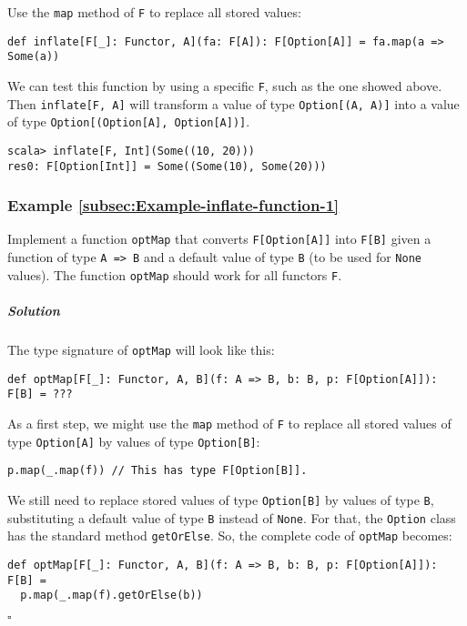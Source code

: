 Use the \lstinline!map! method of \lstinline!F! to replace all stored
values:
\begin{lstlisting}
def inflate[F[_]: Functor, A](fa: F[A]): F[Option[A]] = fa.map(a => Some(a))
\end{lstlisting}
We can test this function by using a specific \lstinline!F!, such
as the one showed above. Then \lstinline!inflate[F, A]! will transform
a value of type \lstinline!Option[(A, A)]! into a value of type \lstinline!Option[(Option[A], Option[A])]!.
\begin{lstlisting}
scala> inflate[F, Int](Some((10, 20)))
res0: F[Option[Int]] = Some((Some(10), Some(20)))
\end{lstlisting}


\subsubsection{Example \label{subsec:Example-inflate-function-1}\ref{subsec:Example-inflate-function-1}}

Implement a function \lstinline!optMap! that converts \lstinline!F[Option[A]]!
into \lstinline!F[B]! given a function of type \lstinline!A => B!
and a default value of type \lstinline!B! (to be used for \lstinline!None!
values). The function \lstinline!optMap! should work for all functors
\lstinline!F!.

\subparagraph{Solution}

The type signature of \lstinline!optMap! will look like this:
\begin{lstlisting}
def optMap[F[_]: Functor, A, B](f: A => B, b: B, p: F[Option[A]]): F[B] = ???
\end{lstlisting}

As a first step, we might use the \lstinline!map! method of \lstinline!F!
to replace all stored values of type \lstinline!Option[A]! by values
of type \lstinline!Option[B]!:
\begin{lstlisting}
p.map(_.map(f)) // This has type F[Option[B]].
\end{lstlisting}
We still need to replace stored values of type \lstinline!Option[B]!
by values of type \lstinline!B!, substituting a default value of
type \lstinline!B! instead of \lstinline!None!. For that, the \lstinline!Option!
class has the standard method \lstinline!getOrElse!. So, the complete
code of \lstinline!optMap! becomes:
\begin{lstlisting}
def optMap[F[_]: Functor, A, B](f: A => B, b: B, p: F[Option[A]]): F[B] =
  p.map(_.map(f).getOrElse(b))
\end{lstlisting}
$\square$


